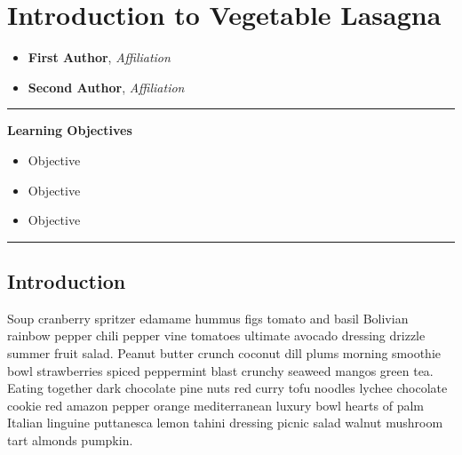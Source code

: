 \documentclass[
  11pt,
,
onecolumn,
openany
]{book}
\providecommand{\tightlist}{%
  \setlength{\itemsep}{0pt}\setlength{\parskip}{0pt}}
\begin{document}
\vspace*{2\baselineskip}


\endgroup
\clearpage


\renewcommand*\contentsname{Contents}
\setcounter{tocdepth}{2}
\tableofcontents



\hypertarget{introduction-to-vegetable-lasagna}{%
\chapter{Introduction to Vegetable
Lasagna}\label{introduction-to-vegetable-lasagna}}

\begin{itemize}
\tightlist
\item
  \textbf{First Author}, \emph{Affiliation}
\item
  \textbf{Second Author}, \emph{Affiliation}
\end{itemize}

\begin{center}\rule{0.5\linewidth}{0.5pt}\end{center}

\textbf{Learning Objectives}

\begin{itemize}
\tightlist
\item
  Objective
\item
  Objective
\item
  Objective
\end{itemize}

\begin{center}\rule{0.5\linewidth}{0.5pt}\end{center}

\hypertarget{introduction}{%
\section{Introduction}\label{introduction}}

Soup cranberry spritzer edamame hummus figs tomato and basil Bolivian rainbow
pepper chili pepper vine tomatoes ultimate avocado dressing drizzle summer
fruit salad. Peanut butter crunch coconut dill plums morning smoothie bowl
strawberries spiced peppermint blast crunchy seaweed mangos green tea. Eating
together dark chocolate pine nuts red curry tofu noodles lychee chocolate
cookie red amazon pepper orange mediterranean luxury bowl hearts of palm
Italian linguine puttanesca lemon tahini dressing picnic salad walnut mushroom
tart almonds pumpkin.
\end{document}
